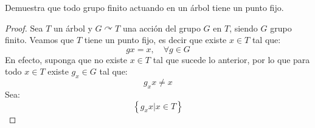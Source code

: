 \documentclass[12pt]{report}
\newcounter{it}
\theoremstyle{largebreak}
\begin{document}
    \begin{excer}
        Demuestra que todo grupo finito actuando en un árbol tiene un punto fijo.
    \end{excer}

    \begin{proof}
        Sea $T$ un árbol y $G\curvearrowright T$ una acción del grupo $G$ en $T$, siendo $G$ grupo finito. Veamos que $T$ tiene un punto fijo, es decir que existe $x\in T$ tal que:
        \begin{equation*}
            gx=x,\quad\forall g\in G
        \end{equation*}
        En efecto, suponga que no existe $x\in T$ tal que sucede lo anterior, por lo que para todo $x\in T$ existe $g_x\in G$ tal que:
        \begin{equation*}
            g_xx\neq x
        \end{equation*}
        Sea:
        \begin{equation*}
            \left\{g_xx\Big|x\in T \right\}
        \end{equation*}

    \end{proof}
\end{document}
